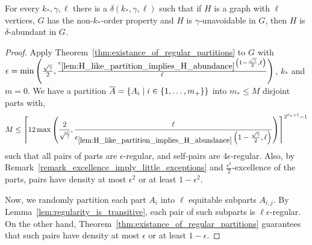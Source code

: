     \begin{theorem} \label{lem:property_testing_with_stable_partitions}
        For every $k_*, \gamma, \ell$ there is a $\delta(k_*, \gamma, \ell)$ such that if $H$ is a graph with $\ell$
        vertices, $G$ has the non-$k_*$-order property and $H$ is $\gamma$-unavoidable in $G$, then $H$ is
        $\delta$-abundant in $G$.
        \begin{proof}
            Apply Theorem~\ref{thm:existance_of_regular_partitions} to $G$ with $\epsilon = \min \left( \frac{\sqrt{\gamma}}{2},
                \frac{\epsilon_{\ref{lem:H_like_partition_implies_H_abundance}} \left( 1 - \frac{\sqrt{\gamma}}{2}, \ell \right)}{\ell} \right)$,
            $k_*$ and $m=0$.
            We have a partition $\overline{A} = \left\{ A_i \mid i \in \left\{ 1, \dots, m_+ \right\} \right\}$ into $m_* \leq M$
            disjoint parts with,
            \[
                M \leq \left\lceil 12 \max\left( \frac{2}{\sqrt{\gamma}}, \frac{\ell}{\epsilon_{\ref{lem:H_like_partition_implies_H_abundance}}
                    \left( 1 - \frac{\sqrt{\gamma}}{2}, \ell \right)} \right) \right\rceil^{2^{k_*+1}-1}
            \]
            such that all pairs of parts are $\epsilon$-regular, and self-pairs are $4 \epsilon$-regular.
            Also, by Remark~\ref{remark_excellence_imply_little_exceptions} and $\frac{\epsilon^2}{2}$-excellence of the parts,
            pairs have density at most $\epsilon^2$ or at least $1 - \epsilon^2$. 

            Now, we randomly partition each part $A_i$ into $\ell$ equitable subparts $A_{i,j}$.
            By Lemma~\ref{lem:regularity_is_transitive}, each pair of such subparts is $\ell \epsilon$-regular.
            On the other hand, Theorem~\ref{thm:existance_of_regular_partitions} guarantees that such pairs have density
            at most $\epsilon$ or at least $1 - \epsilon$.


\end{proof}
\end{theorem}
